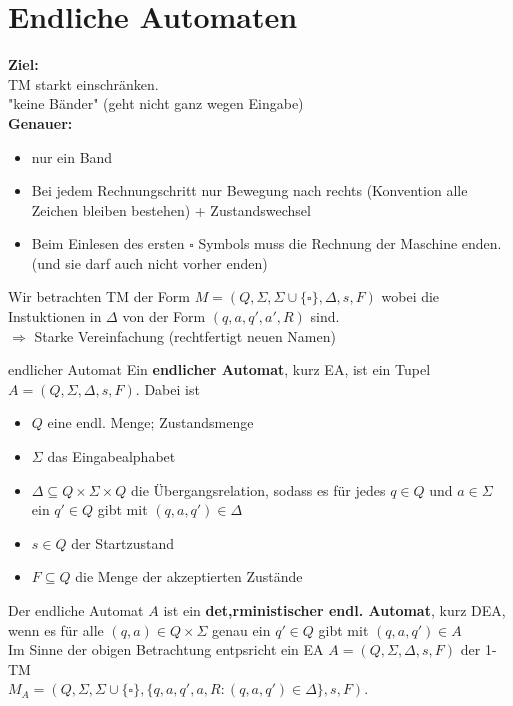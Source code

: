 
\section{Endliche Automaten}
 
\textbf{Ziel:}\\
TM starkt einschränken. \\
"keine Bänder" (geht nicht ganz wegen Eingabe)\\

\textbf{Genauer:}
\begin{itemize}
    \item nur ein Band
    \item Bei jedem Rechnungschritt nur Bewegung nach rechts (Konvention alle Zeichen bleiben bestehen) + Zustandswechsel
    \item Beim Einlesen des ersten $\square$ Symbols muss die Rechnung der Maschine enden. (und sie darf auch nicht vorher enden)
\end{itemize} 

Wir betrachten TM der Form $M = (Q, \Sigma, \Sigma \cup \{\square\}, \Delta, s, F)$ wobei
die Instuktionen in $\Delta$ von der Form $(q,a,q',a',R)$ sind. \\
$\Rightarrow$ Starke Vereinfachung (rechtfertigt neuen Namen)

\begin{defn}{endlicher Automat}
    Ein \textbf{endlicher Automat}, kurz EA, ist ein Tupel $A = (Q, \Sigma, \Delta, s,F)$.
    Dabei ist
    \begin{itemize}
        \item $Q$ eine endl. Menge; Zustandsmenge
        \item $\Sigma$ das Eingabealphabet
        \item $\Delta \subseteq Q \times \Sigma \times Q$ die Übergangsrelation, 
              sodass es für jedes $q \in Q$ und $a \in \Sigma$ ein $q' \in Q$ gibt mit 
              $(q,a,q') \in \Delta$
        \item $s \in Q$ der Startzustand
        \item $F \subseteq Q$ die Menge der akzeptierten Zustände
    \end{itemize}

    Der endliche Automat $A$ ist ein \textbf{det,rministischer endl. Automat}, kurz DEA,
    wenn es für alle $(q,a) \in Q \times \Sigma$ genau ein $q' \in Q$ gibt mit $(q,a,q') \in A$ \\

    Im Sinne der obigen Betrachtung entpsricht ein EA $A=(Q, \Sigma, \Delta, s, F)$ der 1-TM \\
    $M_A = (Q, \Sigma, \Sigma \cup \{\square\},\{q,a,q',a,R:(q,a,q') \in \Delta\},s,F)$.
\end{defn}

